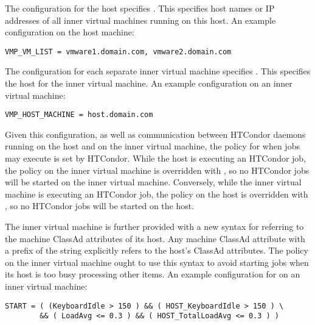 The configuration for the host specifies .
This specifies host names or IP addresses of all inner virtual machines
running on this host.
An example configuration on the host machine:

\footnotesize
\begin{verbatim}
VMP_VM_LIST = vmware1.domain.com, vmware2.domain.com
\end{verbatim}
\normalsize


The configuration for each separate inner virtual machine specifies
.
This specifies the host for the inner virtual machine.
An example configuration on an inner virtual machine:

\footnotesize
\begin{verbatim}
VMP_HOST_MACHINE = host.domain.com
\end{verbatim}
\normalsize

Given this configuration, as well as communication between
HTCondor daemons running on the host and on the inner virtual machine,
the policy for when jobs may execute is set by HTCondor.
While the host is executing an HTCondor job,
the  policy on the inner virtual machine
is overridden with ,
so no HTCondor jobs will be started on the inner virtual machine.
Conversely, while the inner virtual machine is executing an HTCondor job,
the  policy on the host
is overridden with ,
so no HTCondor jobs will be started on the host.

The inner virtual machine is further provided with a new syntax for
referring to the machine ClassAd attributes of its host.
Any machine ClassAd attribute with a prefix of the string
 explicitly refers to the host's ClassAd attributes.
The  policy on the inner virtual machine
ought to use this syntax to avoid starting jobs when its host is
too busy processing other items.
An example configuration for  on an inner virtual machine:

\footnotesize
\begin{verbatim}
START = ( (KeyboardIdle > 150 ) && ( HOST_KeyboardIdle > 150 ) \
        && ( LoadAvg <= 0.3 ) && ( HOST_TotalLoadAvg <= 0.3 ) )
\end{verbatim}
\normalsize

